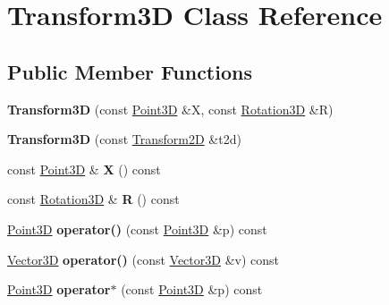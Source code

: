 \hypertarget{classTransform3D}{}\section{Transform3D Class Reference}
\label{classTransform3D}
\subsection*{Public Member Functions}
\begin{DoxyCompactItemize}
\item 
\mbox{\label{classTransform3D_a6ada8f80548da08ccaf8f6ea82cdeaa3}} 
{\bfseries Transform3D} (const \hyperlink{classTVec3D}{Point3D} \&X, const \hyperlink{classRotation3D}{Rotation3D} \&R)
\item 
\mbox{\label{classTransform3D_a71136331c5123efc5bb76ddfcb5c11ef}} 
{\bfseries Transform3D} (const \hyperlink{classTransform2D}{Transform2D} \&t2d)
\item 
\mbox{\label{classTransform3D_ad00b2c4ced2a54d9530c901f807f9f5a}} 
const \hyperlink{classTVec3D}{Point3D} \& {\bfseries X} () const
\item 
\mbox{\label{classTransform3D_abab16f350fa012ffaaac9749ea36e144}} 
const \hyperlink{classRotation3D}{Rotation3D} \& {\bfseries R} () const
\item 
\mbox{\label{classTransform3D_a703b83c1036c04020156a5eb6b5cd2e4}} 
\hyperlink{classTVec3D}{Point3D} {\bfseries operator()} (const \hyperlink{classTVec3D}{Point3D} \&p) const
\item 
\mbox{\label{classTransform3D_a4e72badf90420003396ccea34f23ebe2}} 
\hyperlink{classTVec3D}{Vector3D} {\bfseries operator()} (const \hyperlink{classTVec3D}{Vector3D} \&v) const
\item 
\mbox{\label{classTransform3D_a847c9103814c55c5fd2f6969cc17c137}} 
\hyperlink{classTVec3D}{Point3D} {\bfseries operator$\ast$} (const \hyperlink{classTVec3D}{Point3D} \&p) const
\item 
\mbox{\label{classTransform3D_abe9127d3786ce49f4393b37ef1b14821}} 

\end{DoxyCompactItemize}
